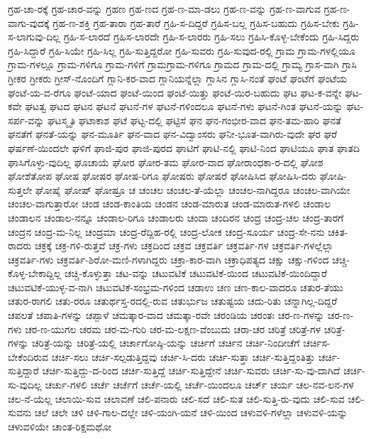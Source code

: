{ಗ್ರಹ-ಚಾ-ರಕ್ಕೆ
ಗ್ರಹ-ಚಾರ-ವನ್ನು
ಗ್ರಹಣ
ಗ್ರಹ-ಣದ
ಗ್ರಹ-ಣ-ಮಾ-ಡಲು
ಗ್ರಹ-ಣ-ವನ್ನು
ಗ್ರಹ-ಣ-ವಾಗುವ
ಗ್ರಹ-ಣ-ವಾಗು-ವುದಕ್ಕೆ
ಗ್ರಹ-ಣ-ಶಕ್ತಿ
ಗ್ರಹ-ತಾರಾ
ಗ್ರಹ-ತಾರೆ
ಗ್ರಹಿ-ಸ-ದಿದ್ದರೆ
ಗ್ರಹಿಸ-ಬಲ್ಲ
ಗ್ರಹಿಸ-ಬಹುದು
ಗ್ರಹಿಸ-ಬೇಕು
ಗ್ರಹಿ-ಸ-ಲಾಗುವು-ದಿಲ್ಲ
ಗ್ರಹಿ-ಸ-ಲಾರದೆ
ಗ್ರಹಿಸ-ಲಾರದೇ
ಗ್ರಹಿ-ಸ-ಲಾರರು
ಗ್ರಹಿ-ಸಲು
ಗ್ರಹಿಸಿ-ಕೊಳ್ಳ-ಬೇಕೆಂದು
ಗ್ರಹಿ-ಸಿದ್ದರು
ಗ್ರಹಿ-ಸಿದ್ದಾರೆ
ಗ್ರಹಿ-ಸಿಯೇ
ಗ್ರಹಿ-ಸಿಲ್ಲ
ಗ್ರಹಿ-ಸುತ್ತಿದ್ದರೋ
ಗ್ರಹಿ-ಸುವರು
ಗ್ರಹಿ-ಸುವುದ-ರಲ್ಲಿ
ಗ್ರಾಮ
ಗ್ರಾಮ-ಗಳಲ್ಲಿಯೂ
ಗ್ರಾಮ-ಗಳಲ್ಲೂ
ಗ್ರಾಮ-ಗಳಿಗೂ
ಗ್ರಾಮ-ಗಳಿಗೆ
ಗ್ರಾಮಗ್ರಾಮ-ಗಳಿಗೂ
ಗ್ರಾಮದ
ಗ್ರಾಮ-ದಲ್ಲಿ
ಗ್ರಾಮ್ಯ
ಗ್ರಾಸ-ವಾಗಿ
ಗ್ರಾಸಿ
ಗ್ರೀಕರ
ಗ್ರೀಕರು
ಗ್ರೀಸ್-ನೊಂದಿಗೆ
ಗ್ಲಾನಿ-ಕರ-ವಾದ
ಗ್ಲಾನಿಯನ್ನೆಲ್ಲಾ
ಗ್ಲಾಸಿನ
ಗ್ಲಾಸಿ-ನಂತೆ
ಘಂಟೆ
ಘಂಟೆಗೆ
ಘಂಟೆಯ
ಘಂಟೆ-ಯ-ವ-ರೆಗೂ
ಘಂಟೆ-ಯಾದ
ಘಂಟೆ-ಯಿಂದ
ಘಂಟೆ-ಯಿತ್ತು
ಘಂಟೆ-ಯಿರ-ಬಹುದು
ಘಟ
ಘಟ-ಕ-ವನ್ನೇ
ಘಟ-ಕವೇ
ಘಟತ್ವ
ಘಟದ
ಘಟನ
ಘಟನೆ
ಘಟನೆ-ಗಳ
ಘಟನೆ-ಗಳಿಂದಲೂ
ಘಟನೆ-ಗಳು
ಘಟನೆ-ಗಿಂತ
ಘಟನೆ-ಯನ್ನು
ಘಟ-ಸರ್ಪ-ವನ್ನು
ಘಟಸ್ಮೃತಿ
ಘಟಾಕಾಶ
ಘಟೆ
ಘಟ್ಟ-ದಲ್ಲಿ
ಘಟ್ಟಿಸೆ
ಘನ
ಘನ-ಗಂಭೀರ-ವಾದ
ಘನ-ತಮ-ಹಾರಿ
ಘನತೆ
ಘನತೆಗೆ
ಘನತೆ-ಯನ್ನು
ಘನ-ಮೂರ್ತಿ
ಘನ-ವಾದ
ಘನ-ವಿದ್ವಾಂಸರು
ಘನೀ-ಭೂತ-ವಾಗಿರು-ವುದೇ
ಘರ
ಘರೆ
ಘರ್ಷಣೆ-ಯಿಂದಲೇ
ಘಳಿಗೆ
ಘಾಜಿ-ಪುರ
ಘಾಜಿ-ಪುರದ
ಘಾಟಿಗೆ
ಘಾಟಿ-ನಲ್ಲಿ
ಘಾಟಿ-ನಿಂದ
ಘಾಟಿಯೂ
ಘಾತ
ಘಾತದಿ
ಘಾಸಿಗೊಳ್ಳು-ವುದಿಲ್ಲ
ಘೂಚಾಯೆ
ಘೋರ
ಘೋರ-ತಮ
ಘೋರ-ವಾದ
ಘೋರಾಂಧಕಾ-ರ-ದಲ್ಲಿ
ಘೋಶ
ಘೋಶೆತೋಪ
ಘೋಷ
ಘೋಷರ
ಘೋಷ-ರಿಗೂ
ಘೋಷರು
ಘೋಷರೆ
ಘೋಷಿಸಿದ
ಘೋಷಿಸಿ-ದರು
ಘೋಷಿ-ಸುತ್ತಲೇ
ಘೋಷೈ
ಘೋಷ್
ಘೋಷ್ರೂ
ಚ
ಚಂಚಲ
ಚಂಚಲ-ತೆ-ಯೆಲ್ಲಾ
ಚಂಚಲ-ನಾಗಿದ್ದರೂ
ಚಂಚಲ-ವಾಗಿಯೇ
ಚಂಚಲ-ವಾಗುತ್ತಾರೋ
ಚಂಡ
ಚಂಡ-ಕಾಂತಿಯ
ಚಂಡನ
ಚಂಡ-ಮಾರುತ
ಚಂಡ-ಮಾರುತ-ಗಳಲಿ
ಚಂಡಾಲ
ಚಂಡಾಲನ
ಚಂಡಾಲ-ನನ್ನೂ
ಚಂಡಾಲ-ರಿಗೂ
ಚಂಡಾಲರು
ಚಂದಾ
ಚಂದಿರನ
ಚಂದ್ರ
ಚಂದ್ರ-ಚಲ
ಚಂದ್ರ-ತಾರಗೆ
ಚಂದ್ರನ
ಚಂದ್ರ-ಮ-ನಿಲ್ಲ
ಚಂದ್ರಮಾ
ಚಂದ್ರ-ರೆದ್ದಿಹ-ರಲ್ಲಿ
ಚಂದ್ರ-ಲೋಕ
ಚಂದ್ರ-ಸೂರ್ಯ
ಚಂದ್ರ-ಸೇ-ನನು
ಚಕಿತ-ರಾದರು
ಚಕ್ರಕ್ಕೆ
ಚಕ್ರ-ಗಳಿ-ರುತ್ತವೆ
ಚಕ್ರ-ಗಳು
ಚಕ್ರದಿಂದ
ಚಕ್ರವ
ಚಕ್ರವರ್ತಿ
ಚಕ್ರವರ್ತಿ-ಗಳ
ಚಕ್ರವರ್ತಿ-ಗಳಲ್ಲೆಲ್ಲಾ
ಚಕ್ರವರ್ತಿ-ಗಳು
ಚಕ್ರವರ್ತಿ-ಶಿರೋ-ಮಣಿ-ಗಳಾಗಿದ್ದರು
ಚಕ್ರಾ-ಕಾರ-ವಾಗಿ
ಚಕ್ರಾಧಿಪತ್ಯದ
ಚಕ್ಷು
ಚಕ್ಷು-ಗಳಿಂದ
ಚಚ್ಚಿ-ಕೊಳ್ಳ-ಬೇಕಾದ್ದಿಲ್ಲ
ಚಚ್ಚಿ-ಕೊಳ್ಳುತ್ತಾ
ಚಟ-ವನ್ನು
ಚಟುವಟಿಕೆ
ಚಟುವಟಿಕೆ-ಯಿಂದ
ಚಟುವಟಿಕೆ-ಯಿಂದಿದ್ದಾರೆ
ಚಟುವಟಿಕೆ-ಯುಳ್ಳ-ವ-ನಾಗಿ
ಚಟುವಟಿಕೆ-ಸಂಭ್ರಮ-ಗಳಿಂದ
ಚಡಾಉ
ಚಣ
ಚಣ-ಕಾಲ-ವಾದರೂ
ಚತುರ-ತೆಯು
ಚತುರ-ರಾಗಲಿ
ಚತು-ರರೂ
ಚತುರ್ಥಸ್ತ-ರದಲ್ಲಿ-ರುವ
ಚತುರ್ಭುಜ
ಚತುಷ್ಟಯ
ಚದು-ರಿತು
ಚನ್ನಾಗಿಲ್ಲ-ದಿದ್ದರೆ
ಚಪಲತೆ
ಚಪಾತಿ-ಗಳನ್ನು
ಚಪ್ಪಾಳೆ
ಚಮತ್ಕಾರ-ವಾದ
ಚಮತ್ಕಾ-ರವೇ
ಚರಂಡಿಯ
ಚರಂತಃ
ಚರ-ಣ-ಗಳನ್ನು
ಚರ-ಣ-ಗಳು
ಚರ-ಣ-ಯುಗಲ
ಚರಮ
ಚರ-ಮ-ಗುರಿ
ಚರ-ಮ-ಲಕ್ಷಣ-ವೆಂಬುದು
ಚರಾ-ಚರ
ಚರಿತ್ರೆ
ಚರಿತ್ರೆ-ಗಳ
ಚರಿತ್ರೆ-ಗಳನ್ನು
ಚರಿತ್ರೆ-ಯನ್ನು
ಚರಿತ್ರೆ-ಯಲ್ಲಿ
ಚರ್ಚಾಗೋಷ್ಠಿ-ಯನ್ನು
ಚರ್ಚಿಗೆ
ಚರ್ಚಿನ
ಚರ್ಚಿ-ನಿಂದೀಚೆಗೆ
ಚರ್ಚಿಸ-ಬೇಕೆಂದಿರುವ
ಚರ್ಚಿ-ಸಲು
ಚರ್ಚಿ-ಸಲ್ಪಡುತ್ತಿದ್ದವು
ಚರ್ಚಿ-ಸಿ-ದರು
ಚರ್ಚಿ-ಸುತ್ತಾ
ಚರ್ಚಿ-ಸುತ್ತಿದ್ದಂತಿತ್ತು
ಚರ್ಚಿ-ಸುತ್ತಿದ್ದಾರೆ
ಚರ್ಚಿ-ಸುತ್ತಿದ್ದು-ದ-ರಿಂದ
ಚರ್ಚಿ-ಸುತ್ತಿದ್ದೆ
ಚರ್ಚಿ-ಸುತ್ತಿದ್ದೇನೆ
ಚರ್ಚಿ-ಸುವರು
ಚರ್ಚಿ-ಸು-ವು-ದಾಗಿದೆ
ಚರ್ಚಿ-ಸು-ವುದಿಲ್ಲ
ಚರ್ಚು-ಗಳಲಿ
ಚರ್ಚೆ
ಚರ್ಚೆಗೆ
ಚರ್ಚೆ-ಯಲ್ಲಿ
ಚರ್ಚೆ-ಯಿಂದಲೂ
ಚರ್ಚ್
ಚರ್ಯ
ಚಲ-ನವ-ಲನ-ಗಳ
ಚಲ-ನೆ-ಯೆಲ್ಲ
ಚಲಾಯಿ-ಸುವ
ಚಲಾವಣೆ
ಚಲಿ-ಪನಾರು
ಚಲಿ-ಸದೆ
ಚಲಿ-ಸುತ
ಚಲಿ-ಸುತ್ತಿ-ರು-ವುದು
ಚಲಿ-ಸುವ
ಚಲಿ-ಸುವನು
ಚಲೆ
ಚಲೇ
ಚಳಿ
ಚಳಿ-ಗಾಲ-ದಲ್ಲೇ
ಚಳಿ-ಯಂಗಿ-ಯನೆ
ಚಳಿ-ಯಿಂದ
ಚಳುವಳಿ-ಗಳೆಲ್ಲಾ
ಚಳುವಳಿ-ಯನ್ನು
ಚಳುವಳಿಯೇ
ಚಾಂತ-ರಿಕ್ಷಮಥೋ
}
